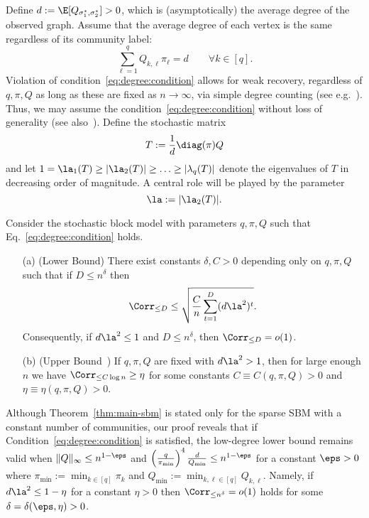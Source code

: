 \documentclass[11pt]{article}
\begin{document}
Define $d := \E[Q_{\sigma^\star_1,\sigma^\star_2}]>0$, which is (asymptotically) the average degree of the observed graph. Assume that the average degree of each vertex is the same regardless of its community label:
\begin{equation}\label{eq:degree:condition}
\sum_{\ell=1}^{q}Q_{k,\ell}\pi_\ell=d \qquad\forall k \in [q].
\end{equation}
Violation of condition~\eqref{eq:degree:condition} allows for weak recovery, regardless of $q,\pi, Q$ as long as these are fixed as $n\to\infty$, via simple degree counting (see e.g.~\cite[Proposition~4.1]{mss-weak}).  Thus, we may assume the condition~\eqref{eq:degree:condition} without loss of generality (see also~\cite{BMNN, AS-acyclic, HS-bayesian}). Define the stochastic matrix
\begin{equation}\label{eq:T}
    T:=\frac{1}{d}\diag(\pi)Q
\end{equation}
and let $1=\la_1(T)\geq |\la_2(T)|\geq \ldots\geq |\lambda_q(T)|$ denote the eigenvalues of $T$ in decreasing order of magnitude. A central role will be played by the parameter
\begin{equation*}
    \la := |\la_2(T)|.
\end{equation*}
\begin{theorem}\label{thm:main-sbm}
    Consider the stochastic block model with parameters $q,\pi,Q$ such that Eq.~\eqref{eq:degree:condition} holds.
    \begin{enumerate}
        \item[(a)] (Lower Bound) There exist constants $\delta,C>0$ depending only on $q,\pi,Q$ such that if $D\leq n^\delta$ then
        \[
        \Corr_{\leq D} \leq \sqrt{\frac{C}{n}\sum_{t=1}^{D}(d\la^2)^{t}}.
        \]
        Consequently, if $d\la^2 \le 1$ and $D \le n^\delta$, then $\Corr_{\le D} = o(1)$.
        \item[(b)] (Upper Bound~\cite{AS-acyclic,HS-bayesian}) If $q,\pi,Q$ are fixed with $d\la^2>1$, then for large enough $n$ we have $\Corr_{\leq C \log n} \ge \eta$ for some constants $C \equiv C(q,\pi,Q)>0$ and $\eta \equiv \eta(q,\pi,Q)>0$.
    \end{enumerate}
\end{theorem}
\begin{remark}
\label{rmk:general:SBM}
    Although Theorem~\ref{thm:main-sbm} is stated only for the sparse SBM with a constant number of communities, our proof reveals that if Condition~\eqref{eq:degree:condition} is satisfied, the low-degree lower bound remains valid when $\|Q\|_{\infty}\leq n^{1-\eps}$ and $\left(\frac{q}{\pi_{\min}}\right)^4\frac{d}{Q_{\min}}\leq n^{1-\eps}$ for a constant $\eps>0$
    where $\pi_{\min}:=\min_{k \in [q]}\pi_k$ and $Q_{\min}:=\min_{k,\ell\in [q]} Q_{k,\ell}$. Namely, if $d\la^2\leq 1-\eta$ for a constant $\eta>0$ then $\Corr_{\leq n^{\delta}}=o(1)$ holds for some $\delta=\delta(\eps,\eta)>0$.
\end{remark}
\end{document}

